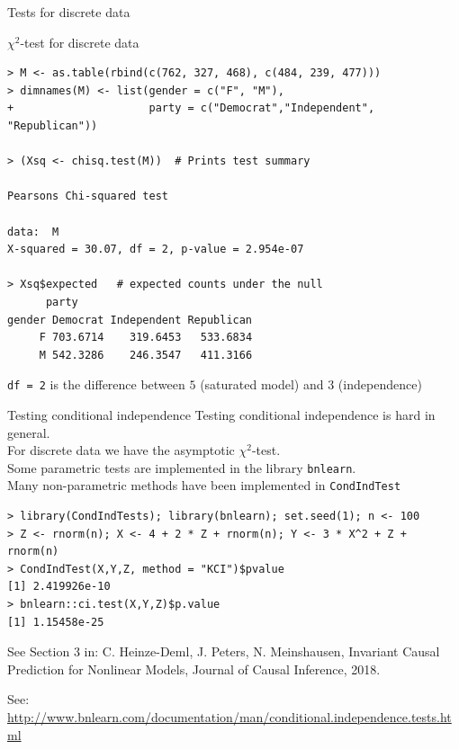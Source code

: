 \documentclass[11pt,handout,aspectratio=169,dvipsnames]{beamer}
\begin{document}
\begin{frame}[fragile]{Tests for discrete data}
	\begin{alertblock}{$\chi^2$-test for discrete data}
   \begin{lstlisting}
> M <- as.table(rbind(c(762, 327, 468), c(484, 239, 477)))
> dimnames(M) <- list(gender = c("F", "M"),
+                     party = c("Democrat","Independent", "Republican"))

> (Xsq <- chisq.test(M))  # Prints test summary

Pearsons Chi-squared test

data:  M
X-squared = 30.07, df = 2, p-value = 2.954e-07
     
> Xsq$expected   # expected counts under the null
      party
gender Democrat Independent Republican
     F 703.6714    319.6453   533.6834
     M 542.3286    246.3547   411.3166
      \end{lstlisting}
\end{alertblock}
\texttt{df = 2} is the difference between $5$ (saturated model) and $3$ (independence)
\end{frame}



\begin{frame}[fragile]{Testing conditional independence}
Testing conditional independence is hard in general.\\[.2cm] 
For discrete data we have the asymptotic $\chi^2$-test.\\[.2cm]

Some parametric tests are implemented in the library \texttt{bnlearn}.\\
Many non-parametric methods have been implemented in \texttt{CondIndTest}
 \begin{lstlisting}
> library(CondIndTests); library(bnlearn); set.seed(1); n <- 100
> Z <- rnorm(n); X <- 4 + 2 * Z + rnorm(n); Y <- 3 * X^2 + Z + rnorm(n)
> CondIndTest(X,Y,Z, method = "KCI")$pvalue 
[1] 2.419926e-10
> bnlearn::ci.test(X,Y,Z)$p.value 
[1] 1.15458e-25
\end{lstlisting}
\medskip

{\scriptsize See Section 3 in: 
C. Heinze-Deml, J. Peters, N. Meinshausen, Invariant Causal Prediction for Nonlinear Models, Journal of Causal Inference, 2018.}
\bigskip

{\scriptsize See: \url{http://www.bnlearn.com/documentation/man/conditional.independence.tests.html}}
\end{frame}
\end{document}
